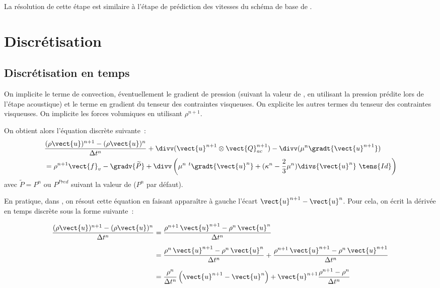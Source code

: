 La résolution de cette étape est similaire à l'étape
de prédiction des vitesses du schéma de base de \CS.

\section*{Discrétisation}
\subsection*{Discrétisation en temps}

On implicite le terme de convection, éventuellement
le gradient de pression (suivant la valeur de , en utilisant la
pression prédite lors de l'étape acoustique) et le terme en gradient
du tenseur des contraintes visqueuses.
On explicite les autres termes du tenseur des contraintes visqueuses.
On implicite les forces
volumiques en utilisant $\rho^{n+1}$.

On obtient alors l'équation discrète suivante~:
\begin{equation}\label{Cfbl_Cfqdmv_eq_vitesse_cfqdmv}
\begin{aligned}
&\displaystyle\frac{(\rho\vect{u})^{n+1}-(\rho\vect{u})^n}{\Delta t^n}
+ \divv(\vect{u}^{n+1} \otimes \vect{Q}_{ac}^{n+1})
- \divv(\mu^n \gradt{\vect{u}^{n+1}})\\
&= \rho^{n+1} \vect{f}_v - \gradv{\widetilde{P}}
+ \divv\left(\mu^n\ ^t\gradt{\vect{u}^n}
+ (\kappa^n-\frac{2}{3}\mu^n)\divs{\vect{u}^n}\ \tens{Id}\right)
\end{aligned}
\end{equation}
avec $\widetilde{P}=P^n\text{ ou }P^{Pred}$ suivant la valeur de 
($P^n$ par défaut).

En pratique, dans \CS, on résout cette équation en faisant apparaître à
gauche l'écart $\vect{u}^{n+1} - \vect{u}^n$. Pour cela, on écrit la
dérivée en temps discrète sous la forme suivante~:

\begin{equation}
\begin{aligned}
\displaystyle
\frac{(\rho \vect{u})^{n+1} - (\rho \vect{u})^n}{\Delta t^n}
& =
\displaystyle
\frac{\rho^{n+1}\, \vect{u}^{n+1} - \rho^n\, \vect{u}^n}{\Delta t^n}\\[0.5em]
& =
\displaystyle
\frac{\rho^{n}\, \vect{u}^{n+1} - \rho^n\, \vect{u}^n}{\Delta t^n}
+
\frac{\rho^{n+1}\, \vect{u}^{n+1} - \rho^n\, \vect{u}^{n+1}}{\Delta t^n}\\[0.5em]
& =
\displaystyle
\frac{\rho^{n}}{\Delta t^n}\left(\vect{u}^{n+1} - \vect{u}^n\right)
+
\vect{u}^{n+1}\frac{\rho^{n+1} - \rho^n}{\Delta t^n}
\end{aligned}
\end{equation}

